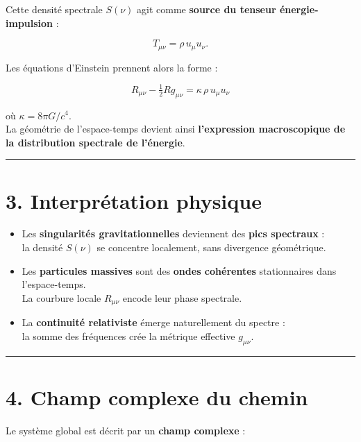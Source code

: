 \documentclass[
  11pt,
]{article}
\begin{document}
Cette densité spectrale \(S(\nu)\) agit comme \textbf{source du tenseur
énergie-impulsion} :

\[
T_{\mu\nu} = \rho\, u_\mu u_\nu.
\]

Les équations d'Einstein prennent alors la forme :

\[
R_{\mu\nu} - \tfrac{1}{2} R g_{\mu\nu} = \kappa\, \rho\, u_\mu u_\nu
\]

où \(\kappa = 8\pi G/c^4\).\\
La géométrie de l'espace-temps devient ainsi \textbf{l'expression
macroscopique de la distribution spectrale de l'énergie}.

\begin{center}\rule{0.5\linewidth}{0.5pt}\end{center}

\hypertarget{interpruxe9tation-physique}{%
\section{3. Interprétation physique}\label{interpruxe9tation-physique}}

\begin{itemize}
\item
  Les \textbf{singularités gravitationnelles} deviennent des
  \textbf{pics spectraux} :\\
  la densité \(S(\nu)\) se concentre localement, sans divergence
  géométrique.
\item
  Les \textbf{particules massives} sont des \textbf{ondes cohérentes}
  stationnaires dans l'espace-temps.\\
  La courbure locale \(R_{\mu\nu}\) encode leur phase spectrale.
\item
  La \textbf{continuité relativiste} émerge naturellement du spectre :\\
  la somme des fréquences crée la métrique effective \(g_{\mu\nu}\).
\end{itemize}

\begin{center}\rule{0.5\linewidth}{0.5pt}\end{center}

\hypertarget{champ-complexe-du-chemin}{%
\section{4. Champ complexe du chemin}\label{champ-complexe-du-chemin}}

Le système global est décrit par un \textbf{champ complexe} :
\end{document}
